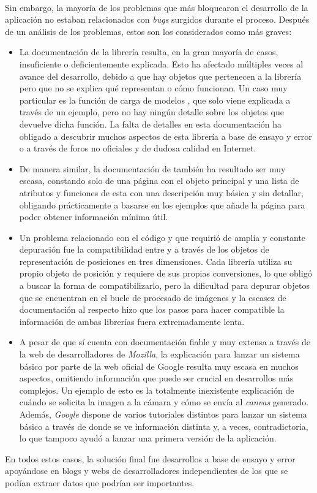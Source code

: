 \documentclass{subfiles}
\begin{document}
    \paragraph{}
    Sin embargo, la mayoría de los problemas que más bloquearon el desarrollo de la aplicación no estaban relacionados con \textit{bugs} surgidos durante el proceso. Después de un análisis de los problemas, estos son los considerados como más graves:
    \begin{itemize}
        \item La documentación de la librería \threejs resulta, en la gran mayoría de casos, insuficiente o deficientemente explicada. Esto ha afectado múltiples veces al avance del desarrollo, debido a que hay objetos que pertenecen a la librería pero que no se explica qué representan o cómo funcionan. Un caso muy particular es la función de carga de modelos \gltf, que solo viene explicada a través de un ejemplo, pero no hay ningún detalle sobre los objetos que devuelve dicha función. La falta de detalles en esta documentación ha obligado a descubrir muchos aspectos de esta librería a base de ensayo y error o a través de foros no oficiales y de dudosa calidad en Internet.
        \item De manera similar, la documentación de \resonanceaudio también ha resultado ser muy escasa, constando solo de una página con el objeto principal y una lista de atributos y funciones de esta con una descripción muy básica y sin detallar, obligando prácticamente a basarse en los ejemplos que añade la página para poder obtener información mínima útil.
        \item Un problema relacionado con el código y que requirió de amplia y constante depuración fue la compatibilidad entre \threejs y \resonanceaudio a través de los objetos de representación de posiciones en tres dimensiones. Cada librería utiliza su propio objeto de posición y requiere de sus propias conversiones, lo que obligó a buscar la forma de compatibilizarlo, pero la dificultad para depurar objetos que se encuentran en el bucle de procesado de imágenes y la escasez de documentación al respecto hizo que los pasos para hacer compatible la información de ambas librerías fuera extremadamente lenta.
        \item A pesar de que \webxr sí cuenta con documentación fiable y muy extensa a través de la web de desarrolladores de \textit{Mozilla}, la explicación para lanzar un sistema básico por parte de la web oficial de Google resulta muy escasa en muchos aspectos, omitiendo información que puede ser crucial en desarrollos más complejos. Un ejemplo de esto es la totalmente inexistente explicación de cuándo se solicita la imagen a la cámara y cómo se envía al \textit{canvas} generado. Además, \textit{Google} dispone de varios tutoriales distintos para lanzar un sistema básico a través de \webxr donde se ve información distinta y, a veces, contradictoria, lo que tampoco ayudó a lanzar una primera versión de la aplicación.
    \end{itemize}

    En todos estos casos, la solución final fue desarrollos a base de ensayo y error apoyándose en blogs y webs de desarrolladores independientes de los que se podían extraer datos que podrían ser importantes.
\end{document}
